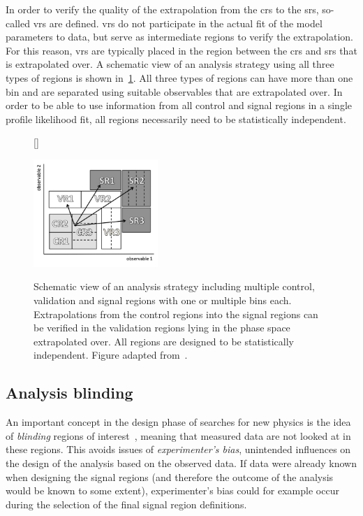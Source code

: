 In order to verify the quality of the extrapolation from the \glspl{cr} to the \glspl{sr}, so-called \glspl{vr} are defined. \glspl{vr} do not participate in the actual fit of the model parameters to data, but serve as intermediate regions to verify the extrapolation.
For this reason, \glspl{vr} are typically placed in the region between the \glspl{cr} and \glspl{sr} that is extrapolated over.
A schematic view of an analysis strategy using all three types of regions is shown in~\cref{fig:hf_strategy}. All three types of regions can have more than one bin and are separated using suitable observables that are extrapolated over.
In order to be able to use information from all control and signal regions in a single profile likelihood fit, all regions necessarily need to be statistically independent.

\begin{figure}
[\FBwidth]
{\caption{Schematic view of an analysis strategy including multiple control, validation and signal regions with one or multiple bins each. Extrapolations from the control regions into the signal regions can be verified in the validation regions lying in the phase space extrapolated over. All regions are designed to be statistically independent. Figure adapted from~\cite{HistFitter:2014wma}.}\label{fig:hf_strategy}}
{\includegraphics[width=0.42\textwidth]{hf_strategy}}
\end{figure}

\subsection{Analysis blinding}

An important concept in the design phase of searches for new physics is the idea of \textit{blinding} regions of interest~\cite{blind:2003rw}, meaning that measured data are not looked at in these regions.
This avoids issues of \textit{experimenter's bias}, \ie unintended influences on the design of the analysis based on the observed data.
If data were already known when designing the signal regions (and therefore the outcome of the analysis would be known to some extent), experimenter's bias could for example occur during the selection of the final signal region definitions.

